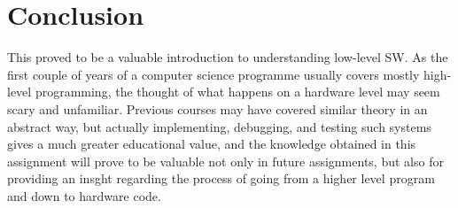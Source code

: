 \section{Conclusion}

This proved to be a valuable introduction to understanding low-level SW. As the first couple of years of a computer science programme usually covers mostly high-level programming, the thought of what happens on a hardware level may seem scary and unfamiliar. Previous courses may have covered similar theory in an abstract way, but actually implementing, debugging, and testing such systems gives a much greater educational value, and the knowledge obtained in this assignment will prove to be valuable not only in future assignments, but also for providing an insght regarding the process of going from a higher level program and down to hardware code.